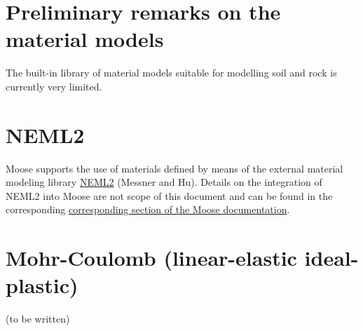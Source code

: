 \section{Preliminary remarks on the material models}
\label{chap:material-remarks}

The built-in library of material models suitable for modelling soil and rock is
currently very limited.

\section{NEML2}
\label{chap:material-NEML2}

Moose supports the use of materials defined by means of the external material
modeling library \href{https://github.com/reverendbedford/neml2}{NEML2}
(Messner and Hu). Details on the integration of NEML2 into Moose are not scope
of this document and can be found in the corresponding
\href{https://mooseframework.inl.gov/moose/modules/solid_mechanics/NEML2.html}{corresponding
    section of the Moose documentation}.

\section{Mohr-Coulomb (linear-elastic ideal-plastic)}
\label{chap:material-mohr-coulomb}

(to be written)
